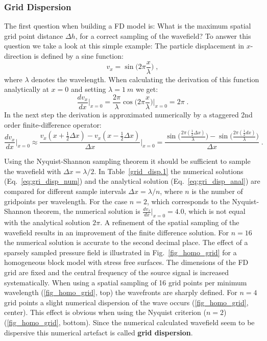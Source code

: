 \subsubsection{Grid Dispersion}
\label{grid-dispersion}
The first question when building a FD model is: What is the maximum spatial grid point distance $\Delta h$, for a correct sampling of the wavefield? To answer this question we take a look at this simple example: The particle displacement in $x$-direction is defined by a sine function:
\begin{equation}
   v_x=\sin\biggl(2 \pi \frac{x}{\lambda}\biggr) \;,
   \label{eq:gri_disp}
\end{equation}
where $\lambda$ denotes the wavelength. When calculating the derivation of this function analytically at $x=0$ and setting $\lambda=\SI{1}{m}$ we get:
\begin{equation}
    \frac{d v_x}{d x}\biggl|_{x=0} = \frac{2 \pi}{\lambda} \cos\biggl(2 \pi \frac{x}{\lambda}\biggr)\biggl|_{x=0}=2 \pi\;.
    \label{eq:gri_disp_anal}
\end{equation}
In the next step the derivation is approximated numerically by a staggered 2nd order finite-difference operator:
\begin{equation}
    \frac{d v_x}{d x}\biggl|_{x=0} \approx \frac{v_x(x+\frac{1}{2}\Delta x)-v_x(x-\frac{1}{2}\Delta x)}{\Delta x}\biggl|_{x=0}=\frac{\sin \biggl(\frac{2 \pi (\frac{1}{2}{\Delta x})}{\lambda} \biggr)-\sin \biggl(\frac{2 \pi (\frac{1}{2}{dx})}{\lambda} \biggr)}{\Delta x}\;.
    \label{eq:gri_disp_num}
\end{equation}

Using the Nyquist-Shannon sampling theorem it should be sufficient to sample the wavefield with $\Delta x = \lambda/2$. In Table~\ref{grid_disp.1} the numerical solutions (Eq.~\ref{eq:gri_disp_num}) and the analytical solution (Eq.~\ref{eq:gri_disp_anal}) are compared for different sample intervals $\Delta x = \lambda /n$, where $n$ is the number of gridpoints per wavelength. For the case $n=2$, which corresponds to the Nyquist-Shannon theorem, the numerical solution is $\frac{d v_x}{d x}|_{x=0}=4.0$, which is not equal with the analytical solution $2 \pi$. A refinement of the spatial sampling of the wavefield results in an improvement of the finite difference solution. For $n=16$ the numerical solution is accurate to the second decimal place. The effect of a sparsely sampled pressure field is illustrated in Fig.~\ref{fig_homo_grid} for a homogeneous block model with stress free surfaces. The dimensions of the FD grid are fixed and the central frequency of the source signal is increased systematically.  When using a spatial sampling of 16 grid points per minimum wavelength (\ref{fig_homo_grid}, top) the wavefronts are sharply defined. For $n=4$  grid points a slight numerical dispersion of the wave occurs (\ref{fig_homo_grid}, center). This effect is obvious when using the Nyquist criterion ($n=2$) (\ref{fig_homo_grid}, bottom). Since the numerical calculated wavefield seem to be dispersive this numerical artefact is called {\textbf{grid dispersion}}. 

